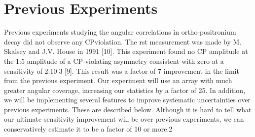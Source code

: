 \section{Previous Experiments}
\label{sec:mjd}
Previous experiments studying the angular correlations in ortho-positronium decay did not observe any CPviolation.
The rst measurement was made by M. Skalsey and J.V. House in 1991 [10]. This experiment
found no CP amplitude at the 1:5%
amplitude of a CP-violating asymmetry consistent with zero at a sensitivity of 2:10􀀀3 [9]. This result
was a factor of 7 improvement in the limit from the previous experiment. Our experiment will use an array
with much greater angular coverage, increasing our statistics by a factor of 25. In addition, we will be
implementing several features to improve systematic uncertainties over previous experiments. These are
described below. Although it is hard to tell what our ultimate sensitivity improvement will be over previous
experiments, we can conservatively estimate it to be a factor of 10 or more.2

